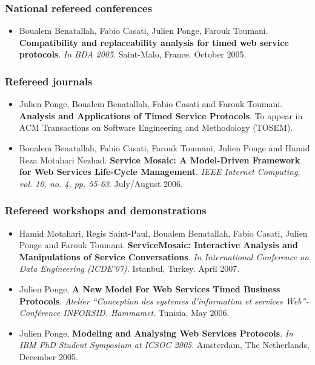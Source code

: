 \subsubsection{National refereed conferences}
\begin{itemize}

	\item Boualem Benatallah, Fabio Casati, Julien Ponge, Farouk Toumani. \textbf{Compatibility and replaceability analysis for timed web service protocols}. \emph{In BDA 2005}. Saint-Malo, France. October 2005.

\end{itemize}

\subsubsection{Refereed journals}
\begin{itemize}
    
    \item Julien Ponge, Boualem Benatallah, Fabio Casati and Farouk Toumani. \textbf{Analysis and Applications of Timed Service Protocols}. To appear in ACM Transactions on Software Engineering and Methodology (TOSEM).

	\item Boualem Benatallah, Fabio Casati, Farouk Toumani, Julien Ponge and Hamid Reza Motahari Nezhad. \textbf{Service Mosaic: A Model-Driven Framework for Web Services Life-Cycle Management}. \emph{IEEE Internet Computing, vol. 10, no. 4, pp. 55-63}. July/August 2006.

\end{itemize}

\subsubsection{Refereed workshops and demonstrations}
\begin{itemize}

	\item Hamid Motahari, Regis Saint-Paul, Boualem Benatallah, Fabio Casati, Julien Ponge and Farouk Toumani. \textbf{ServiceMosaic: Interactive Analysis and Manipulations of Service Conversations}. \emph{In International Conference on Data Engineering (ICDE'07).} Istanbul, Turkey. April 2007.
	
	\item Julien Ponge, \textbf{A New Model For Web Services Timed Business Protocols}. \emph{Atelier ``Conception des systemes d'information et services Web''- Conf\'erence INFORSID. Hammamet}. Tunisia, May 2006.
	
	\item Julien Ponge, \textbf{Modeling and Analysing Web Services Protocols}. \emph{In IBM PhD Student Symposium at ICSOC 2005}. Amsterdam, The Netherlands, December 2005.

\end{itemize}

